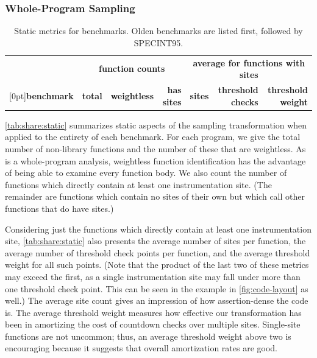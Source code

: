 \subsubsection{Whole-Program Sampling}
\label{sec:share:whole}

\begin{table}[tb]
  \centering
  \small
  \begin{tabular}{|l|rrr|rrr|}
    \hline
    & \multicolumn{3}{c|}{\textbf{function counts}} & \multicolumn{3}{c|}{\textbf{average for functions with sites}} \\
    \raisebox{1.5ex}[0pt]{\textbf{benchmark}} & \textbf{total} & \textbf{weightless} & \textbf{has sites} & \textbf{sites} & \textbf{threshold checks} & \textbf{threshold weight} \\
    \hline\hline
    
  \end{tabular}
  \caption{Static metrics for \CCured benchmarks.  Olden benchmarks
    are listed first, followed by SPECINT95.}
  \label{tab:share:static}
\end{table}

\autoref{tab:share:static} summarizes static aspects of the sampling
transformation when applied to the entirety of each benchmark.  For
each program, we give the total number of non-library functions and
the number of these that are weightless.  As \CCured is a
whole-program analysis, weightless function identification has the
advantage of being able to examine every function body.  We also count
the number of functions which directly contain at least one
instrumentation site.  (The remainder are functions which contain no
sites of their own but which call other functions that do have sites.)

Considering just the functions which directly contain at least one
instrumentation site, \autoref{tab:share:static} also presents the
average number of sites per function, the average number of threshold
check points per function, and the average threshold weight for all
such points.  (Note that the product of the last two of these metrics
may exceed the first, as a single instrumentation site may fall under
more than one threshold check point.  This can be seen in the example
in \autoref{fig:code-layout} as well.)  The average site count gives
an impression of how assertion-dense the code is.  The average
threshold weight measures how effective our transformation has been in
amortizing the cost of countdown checks over multiple sites.
Single-site functions are not uncommon; thus, an average threshold
weight above two is encouraging because it suggests that overall
amortization rates are good.


